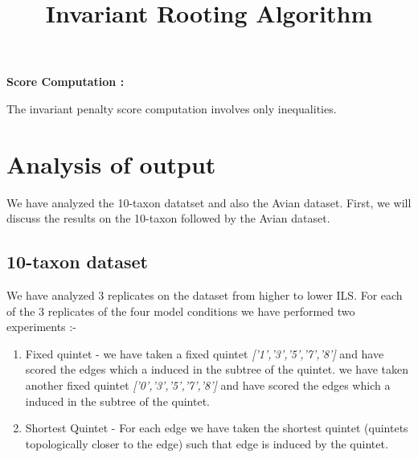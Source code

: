 \documentclass[letterpaper, 12pt]{article}
\title{ Invariant  Rooting  Algorithm }
\begin{document}
\maketitle

{\bf Score Computation : } 

The invariant penalty score computation involves only inequalities.

\section{Analysis of output}

 We have analyzed the 10-taxon datatset and also the Avian dataset. First, we will discuss the results on the 10-taxon followed by the Avian dataset.
 
 \subsection{10-taxon dataset}
 
 We have analyzed 3 replicates on the  dataset from higher to lower ILS. For each of the 3 replicates of the four model conditions we have performed two experiments :-
 
 \begin{enumerate}
 \item Fixed quintet - we have taken a fixed quintet {\em ['1','3','5','7','8'] } and have scored the edges which a induced in the subtree of the quintet. 
 				we have taken another fixed quintet {\em ['0','3','5','7','8'] } and have scored the edges which a induced in the subtree of the quintet. 

 \item Shortest Quintet - For each edge we have taken the shortest quintet (quintets topologically closer to the edge) such that edge is induced by the quintet.
 \end{enumerate}
 
\end{document}
